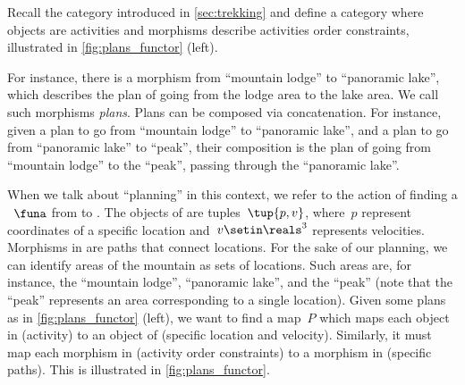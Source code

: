 \begin{example}
    \label{exa:planning-as-search-functor}
    Recall the category \Berg introduced in \cref{sec:trekking} and define a category \Plans where objects are activities and morphisms describe activities order constraints, illustrated in \cref{fig:plans_functor} (left).

    For instance, there is a morphism from ``mountain lodge'' to ``panoramic lake'', which describes the plan of going from the lodge area to the lake area.
    We call such morphisms \emph{plans}.
    Plans can be composed via concatenation.
    For instance, given a plan to go from ``mountain lodge'' to ``panoramic lake'', and a plan to go from ``panoramic lake'' to ``peak'', their composition is the plan of going from ``mountain lodge'' to the ``peak'', passing through the ``panoramic lake''.

    When we talk about ``planning'' in this context, we refer to the action of finding a ~$\funa$ from \Plans to \Berg.
    The objects of \Berg are tuples~$\tup{p,v}$, where~$p$ represent coordinates of a specific location and~$v\setin \reals^3$ represents velocities.
    Morphisms in \Berg are paths that connect locations.
    For the sake of our planning, we can identify areas of the mountain as sets of locations.
    Such areas are, for instance, the ``mountain lodge'', ``panoramic lake'', and the
    ``peak'' (note that the ``peak'' represents an area corresponding to a single location).
    Given some plans as in \cref{fig:plans_functor} (left), we want to find a map~$P$ which maps each object in \Plans (activity) to an object of \Berg (specific location and velocity).
    Similarly, it must map each morphism in \Plans (activity order constraints) to a morphism in \Berg (specific paths).
    This is illustrated in \cref{fig:plans_functor}.
\end{example}

\begin{figure*}[h!]
    \centering
    \caption{Planning .}
    \label{fig:plans_functor}
\end{figure*}

\vfill
\clearpage
\vfill

